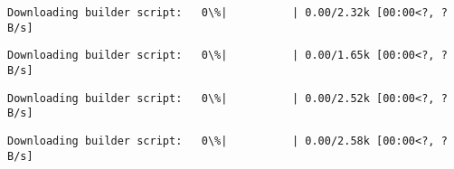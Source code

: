 \documentclass[11pt]{article}
\begin{document}
    
    \begin{Verbatim}[commandchars=\\\{\}]
Downloading builder script:   0\%|          | 0.00/2.32k [00:00<?, ?B/s]
    \end{Verbatim}

    
    
    \begin{Verbatim}[commandchars=\\\{\}]
Downloading builder script:   0\%|          | 0.00/1.65k [00:00<?, ?B/s]
    \end{Verbatim}

    
    
    \begin{Verbatim}[commandchars=\\\{\}]
Downloading builder script:   0\%|          | 0.00/2.52k [00:00<?, ?B/s]
    \end{Verbatim}

    
    
    \begin{Verbatim}[commandchars=\\\{\}]
Downloading builder script:   0\%|          | 0.00/2.58k [00:00<?, ?B/s]
    \end{Verbatim}
\end{document}
